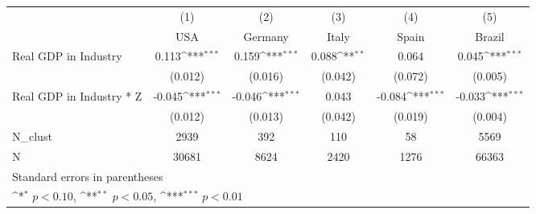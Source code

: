 {
\def\sym#1{\ifmmode^{#1}\else\(^{#1}\)\fi}
\begin{tabular}{l*{5}{c}}
\hline\hline
            &\multicolumn{1}{c}{(1)}&\multicolumn{1}{c}{(2)}&\multicolumn{1}{c}{(3)}&\multicolumn{1}{c}{(4)}&\multicolumn{1}{c}{(5)}\\
            &\multicolumn{1}{c}{USA}&\multicolumn{1}{c}{Germany}&\multicolumn{1}{c}{Italy}&\multicolumn{1}{c}{Spain}&\multicolumn{1}{c}{Brazil}\\
\hline
Real GDP in Industry&       0.113\sym{***}&       0.159\sym{***}&       0.088\sym{**} &       0.064         &       0.045\sym{***}\\
            &     (0.012)         &     (0.016)         &     (0.042)         &     (0.072)         &     (0.005)         \\
[1em]
Real GDP in Industry * Z&      -0.045\sym{***}&      -0.046\sym{***}&       0.043         &      -0.084\sym{***}&      -0.033\sym{***}\\
            &     (0.012)         &     (0.013)         &     (0.042)         &     (0.019)         &     (0.004)         \\
\hline
N\_clust     &        2939         &         392         &         110         &          58         &        5569         \\
N           &       30681         &        8624         &        2420         &        1276         &       66363         \\
\hline\hline
\multicolumn{6}{l}{\footnotesize Standard errors in parentheses}\\
\multicolumn{6}{l}{\footnotesize \sym{*} \(p<0.10\), \sym{**} \(p<0.05\), \sym{***} \(p<0.01\)}\\
\end{tabular}
}
